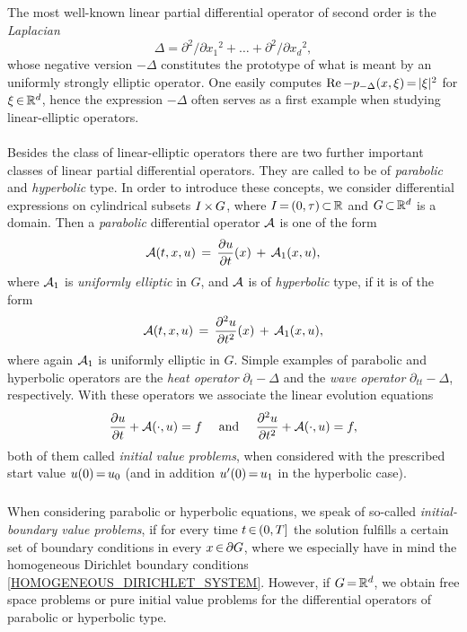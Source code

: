 \documentclass[11pt,twoside]{article}
\def\G{G}
\begin{document}
\subparagraph{} %
The most well-known linear partial differential operator of second order
is the \textit{Laplacian}
\[
\Delta = \partial^2 / \partial {x_1}^2 + \ldots
       + \partial^2 / \partial {x_d}^2,
\]
whose negative version $-\Delta$ constitutes the prototype
of what is meant by an {uniformly strongly elliptic operator}.
One easily computes
$\re -p_{-\Delta}(x,\xi) \eq \abs{\xi} ^2$ for $\xi {\,\in\,} {\mathbb{R}}^d$,
hence the expression $-\Delta$ often serves as a first example
when studying linear-elliptic operators.

\paragraph{} %
Besides the class of {linear-elliptic} operators
there are two further important classes
of linear partial differential operators.
They are called to be of \textit{parabolic} and \textit{hyperbolic} type.
In order to introduce these concepts,
we consider differential expressions on cylindrical subsets
$\J \xtimes \G$,
where $I {\,=\,} (0,\tau) {\,\subset\,} {\mathbb{R}}$ and $\G \xsubset \Rd$ is a domain.
Then a \textit{parabolic} differential operator ${\mathcal{A}}$ is one of the form
\[
{\mathcal{A}}(t,x,u) \,=\, \frac{\partial u}{\partial t}(x) \,+\, {\mathcal{A}}_1(x,u),
\]
where ${\mathcal{A}}_1$ is \textit{uniformly elliptic} in $\G$,
and ${\mathcal{A}}$ is of \textit{hyperbolic} type,
if it is of the form
\[
{\mathcal{A}}(t,x,u) \,=\, \frac{\partial^2 u}{\partial t^2}(x) \,+\, {\mathcal{A}}_1(x,u),
\]
where again ${\mathcal{A}}_1$ is uniformly elliptic in $\G$.
Simple examples of para\-bolic and hyper\-bolic operators are
the \textit{heat operator} $\partial_t    - \Delta$ and
the \textit{wave operator} $\partial_{tt} - \Delta$,
respectively.
With these operators we associate the linear evolution equations
\[
\frac{\partial u}{\partial t} + {\mathcal{A}}(\cdot,u) = f
\quad \mbox{ and } \quad
\frac{\partial^2 u}{\partial t^2} + {\mathcal{A}}(\cdot,u) = f,
\]
both of them called \textit{initial value problems},
when considered with the prescribed start value $u(0) {\,=\,} u_0$
(and in addition $u'(0) {\,=\,} u_1$ in the hyperbolic case).

\subparagraph{} %
When considering parabolic or hyperbolic equations,
we speak of so-called \textit{initial-boundary value problems},
if for every time $t {\,\in\,} (0,T]$ the solution fulfills
a certain set of boundary conditions in every $x \xeof \bndG$,
where we especially have in mind the homogeneous Dirichlet boundary conditions
\eqref{HOMOGENEOUS_DIRICHLET_SYSTEM}.
However,
if $\G \eq \Rd$,
we obtain free space problems or pure initial value problems
for the differential operators of parabolic or hyperbolic type.
\end{document}
